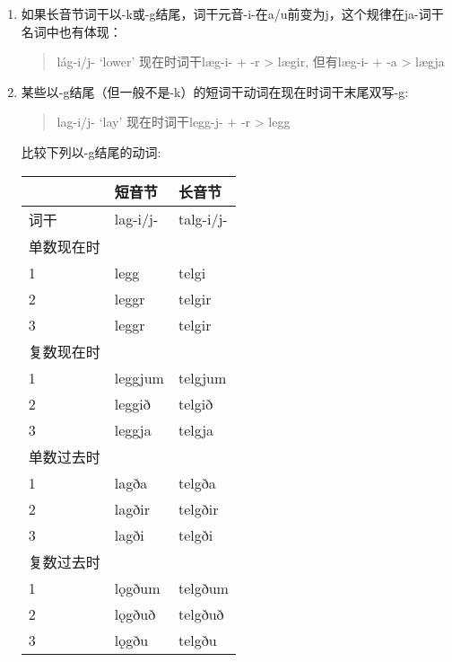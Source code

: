 \begin{enumerate}
    \item
          如果长音节词干以-k或-g结尾，词干元音-i-在a/u前变为j，这个规律在ja-词干名词中也有体现：

          \begin{quote}
              lág-i/j- `lower‌'  现在时词干læg-i- + -r > lægir, 但有læg-i- + -a > lægja
          \end{quote}
    \item
          某些以-g结尾（但一般不是-k）的短词干动词在现在时词干末尾双写-g:

          \begin{quote}lag-i/j- `lay‌' 现在时词干legg-j- + -r > legg\end{quote}

          比较下列以-g结尾的动词:

          \begin{longtable}{lll}
              \toprule
                    & 短音节      & 长音节       \\
              \midrule
              \endhead
              \bottomrule
              \endfoot
              词干    & lag-i/j- & talg-i/j- \\
              单数现在时 &          &           \\
              1     & legg     & telgi     \\
              2     & leggr    & telgir    \\
              3     & leggr    & telgir    \\
              复数现在时 &          &           \\
              1     & leggjum  & telgjum   \\
              2     & leggið   & telgið    \\
              3     & leggja   & telgja    \\
              单数过去时 &          &           \\
              1     & lagða    & telgða    \\
              2     & lagðir   & telgðir   \\
              3     & lagði    & telgði    \\
              复数过去时 &          &           \\
              1     & lǫgðum   & telgðum   \\
              2     & lǫgðuð   & telgðuð   \\
              3     & lǫgðu    & telgðu    \\
          \end{longtable}


\end{enumerate}
